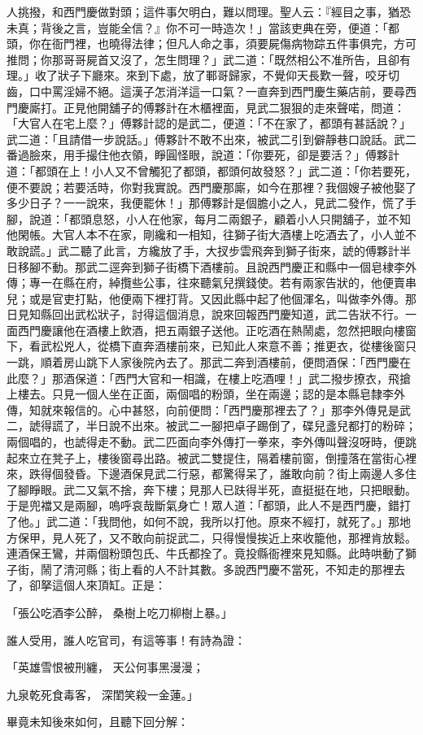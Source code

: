人挑撥，和西門慶做對頭；這件事欠明白，難以問理。聖人云：『經目之事，猶恐未真；背後之言，豈能全信？』你不可一時造次！」當該吏典在旁，便道：「都頭，你在衙門裡，也曉得法律；但凡人命之事，須要屍傷病物踪五件事俱完，方可推問；你那哥哥屍首又沒了，怎生問理？」武二道：「既然相公不准所告，且卻有理。」收了狀子下廳來。來到下處，放了鄆哥歸家，不覺仰天長歎一聲，咬牙切齒，口中罵淫婦不絕。這漢子怎消洋這一口氣？一直奔到西門慶生藥店前，要尋西門慶廝打。正見他開舖子的傅夥計在木櫃裡面，見武二狠狠的走來聲喏，問道：「大官人在宅上麼？」傅夥計認的是武二，便道：「不在家了，都頭有甚話說？」武二道：「且請借一步說話。」傅夥計不敢不出來，被武二引到僻靜巷口說話。武二番過臉來，用手撮住他衣領，睜圓怪眼，說道：「你要死，卻是要活？」傅夥計道：「都頭在上！小人又不曾觸犯了都頭，都頭何故發怒？」武二道：「你若要死，便不要說；若要活時，你對我實說。西門慶那廝，如今在那裡？我個嫂子被他娶了多少日子？一一說來，我便罷休！」那傅夥計是個膽小之人，見武二發作，慌了手腳，說道：「都頭息怒，小人在他家，每月二兩銀子，顧着小人只開舖子，並不知他閑帳。大官人本不在家，剛纔和一相知，往獅子街大酒樓上吃酒去了，小人並不敢說謊。」武二聽了此言，方纔放了手，大扠步雲飛奔到獅子街來，諕的傅夥計半日移腳不動。那武二逕奔到獅子街橋下酒樓前。且說西門慶正和縣中一個皂棣李外傳；專一在縣在府，綽攬些公事，往來聽氣兒撰錢使。若有兩家告狀的，他便賣串兒；或是官吏打點，他便兩下裡打背。又因此縣中起了他個渾名，叫做李外傳。那日見知縣回出武松狀子，討得這個消息，說來回報西門慶知道，武二告狀不行。一面西門慶讓他在酒樓上飲酒，把五兩銀子送他。正吃酒在熱鬧處，忽然把眼向樓窗下，看武松兇人，從橋下直奔酒樓前來，已知此人來意不善；推更衣，從樓後窗只一跳，順着房山跳下人家後院內去了。那武二奔到酒樓前，便問酒保：「西門慶在此麼？」那酒保道：「西門大官和一相識，在樓上吃酒哩！」武二撥步撩衣，飛搶上樓去。只見一個人坐在正面，兩個唱的粉頭，坐在兩邊；認的是本縣皂隸李外傳，知就來報信的。心中甚怒，向前便問：「西門慶那裡去了？」那李外傳見是武二，諕得謊了，半日說不出來。被武二一腳把卓子踢倒了，碟兒盞兒都打的粉碎；兩個唱的，也諕得走不動。武二匹面向李外傳打一拳來，李外傳叫聲沒呀時，便跳起來立在凳子上，樓後窗尋出路。被武二雙提住，隔着樓前窗，倒撞落在當街心裡來，跌得個發昏。下邊酒保見武二行惡，都驚得呆了，誰敢向前？街上兩邊人多住了腳睜眼。武二又氣不捨，奔下樓；見那人已趺得半死，直挺挺在地，只把眼動。于是兜襠又是兩腳，嗚呼哀哉斷氣身亡！眾人道：「都頭，此人不是西門慶，錯打了他。」武二道：「我問他，如何不說，我所以打他。原來不經打，就死了。」那地方保甲，見人死了，又不敢向前捉武二，只得慢慢挨近上來收籠他，那裡肯放鬆。連酒保王鸞，并兩個粉頭包氏、牛氏都拴了。竟投縣衙裡來見知縣。此時哄動了獅子街，鬧了清河縣；街上看的人不計其數。多說西門慶不當死，不知走的那裡去了，卻拏這個人來頂缸。正是：

「張公吃酒李公醉，  桑樹上吃刀柳樹上暴。」

誰人受用，誰人吃官司，有這等事！有詩為證：

「英雄雪恨被刑纏，  天公何事黑漫漫；

九泉乾死食毒客，  深閨笑殺一金蓮。」

畢竟未知後來如何，且聽下回分解：
